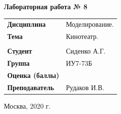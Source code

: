 \documentclass[a4paper,14pt]{extreport} %
\begin{document}
\begin{titlepage}
    \vspace{2cm}

    \begin{center}
        \textbf{Лабораторная работа № 8} \\
        \vspace{0.5cm}
    \end{center}

    \vspace{4cm}

    \begin{flushleft}
        \begin{tabular}{ll}
            \textbf{Дисциплина} & Моделирование.  \\
            \textbf{Тема} & Кинотеатр.  \\
            \\
            \textbf{Студент} & Сиденко А.Г. \\
            \textbf{Группа} & ИУ7-73Б \\
            \textbf{Оценка (баллы)} & \\
            \textbf{Преподаватель} & Рудаков И.В.   \\
        \end{tabular}
    \end{flushleft}

    \vspace{4cm}

   \begin{center}
        Москва, 2020 г.
    \end{center}

\end{titlepage}
\end{document}
